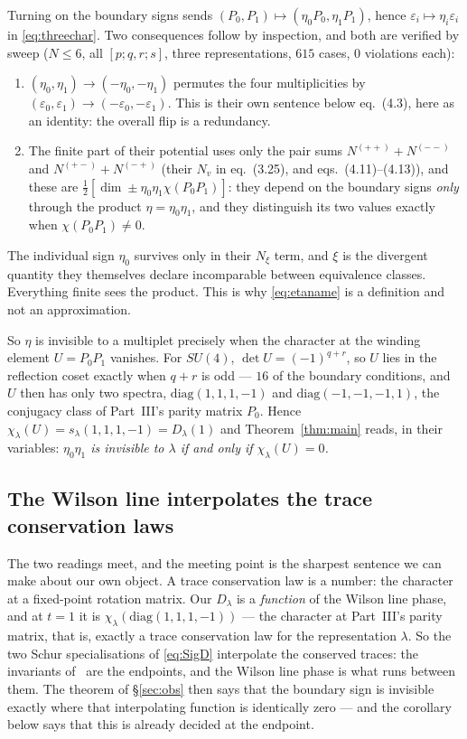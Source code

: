 \documentclass[11pt,a4paper]{article}
\newcommand{\su}[1]{SU(#1)}
\newcommand{\Dl}{D_\lambda}
\begin{document}
Turning on the boundary signs sends $(P_0,P_1)\mapsto(\eta_0P_0,\eta_1P_1)$, hence
$\varepsilon_i\mapsto\eta_i\varepsilon_i$ in \eqref{eq:threechar}. Two consequences follow by
inspection, and both are verified by sweep ($N\le6$, all $[p;q,r;s]$, three representations, $615$
cases, $0$ violations each):
\begin{enumerate}\itemsep2pt
\item $(\eta_0,\eta_1)\to(-\eta_0,-\eta_1)$ permutes the four multiplicities by
$(\varepsilon_0,\varepsilon_1)\to(-\varepsilon_0,-\varepsilon_1)$. This is their own sentence below
eq.~(4.3), here as an identity: the overall flip is a redundancy.
\item The finite part of their potential uses only the pair sums $N^{(++)}+N^{(--)}$ and
$N^{(+-)}+N^{(-+)}$ (their $N_v$ in eq.~(3.25), and eqs.~(4.11)--(4.13)), and these are
$\frac12[\dim\pm\eta_0\eta_1\chi(P_0P_1)]$: they depend on the boundary signs \emph{only} through the
product $\eta=\eta_0\eta_1$, and they distinguish its two values exactly when $\chi(P_0P_1)\neq0$.
\end{enumerate}
The individual sign $\eta_0$ survives only in their $N_\xi$ term, and $\xi$ is the divergent quantity
they themselves declare incomparable between equivalence classes. Everything finite sees the
product. This is why \eqref{eq:etaname} is a definition and not an approximation.

So $\eta$ is invisible to a multiplet precisely when the character at the winding element
$U=P_0P_1$ vanishes. For $\su4$, $\det U=(-1)^{q+r}$, so $U$ lies in the reflection coset exactly
when $q+r$ is odd --- $16$ of the boundary conditions, and $U$ then has only two spectra,
$\mathrm{diag}(1,1,1,-1)$ and $\mathrm{diag}(-1,-1,-1,1)$, the conjugacy class of Part~III's parity
matrix $P_0$. Hence $\chi_\lambda(U)=s_\lambda(1,1,1,-1)=\Dl(1)$ and Theorem~\ref{thm:main} reads, in
their variables: \emph{$\eta_0\eta_1$ is invisible to $\lambda$ if and only if $\chi_\lambda(U)=0$.}

\subsection{The Wilson line interpolates the trace conservation laws}\label{sec:interp}

The two readings meet, and the meeting point is the sharpest sentence we can make about our own
object. A trace conservation law is a number: the character at a fixed-point rotation matrix. Our
$\Dl$ is a \emph{function} of the Wilson line phase, and at $t=1$ it is
$\chi_\lambda(\mathrm{diag}(1,1,1,-1))$ --- the character at Part~III's parity matrix, that is,
exactly a trace conservation law for the representation $\lambda$. So the two Schur specialisations
of \eqref{eq:SigD} interpolate the conserved traces: the invariants of~\cite{TI1,TI2} are the
endpoints, and the Wilson line phase is what runs between them. The theorem of \S\ref{sec:obs} then
says that the boundary sign is invisible exactly where that interpolating function is identically
zero --- and the corollary below says that this is already decided at the endpoint.
\end{document}
